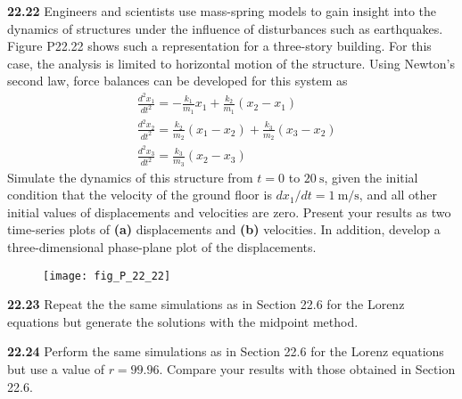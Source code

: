 \documentclass[../main.tex]{subfiles}
\begin{document}
\begin{multicols}{2}
    \noindent\textbf{22.22} Engineers and scientists use mass-spring models to gain insight into the dynamics of structures under the influence of disturbances such as earthquakes. Figure P22.22 shows such a representation for a three-story building. For this case, the analysis is limited to horizontal motion of the structure. Using Newton's second law, force balances can be developed for this system as
    $$
    \begin{aligned}
    &\frac{d^{2} x_{1}}{d t^{2}}=-\frac{k_{1}}{m_{1}} x_{1}+\frac{k_{2}}{m_{1}}\left(x_{2}-x_{1}\right) \\
    &\frac{d^{2} x_{2}}{d t^{2}}=\frac{k_{2}}{m_{2}}\left(x_{1}-x_{2}\right)+\frac{k_{3}}{m_{2}}\left(x_{3}-x_{2}\right) \\
    &\frac{d^{2} x_{3}}{d t^{2}}=\frac{k_{3}}{m_{3}}\left(x_{2}-x_{3}\right)
    \end{aligned}
    $$
    Simulate the dynamics of this structure from $t=0$ to $20 \mathrm{~s}$, given the initial condition that the velocity of the ground floor is $d x_{1} / d t=1 \mathrm{~m} / \mathrm{s}$, and all other initial values of displacements and velocities are zero. Present your results as two time-series plots of \textbf{(a)} displacements and \textbf{(b)} velocities. In addition, develop a     three-dimensional phase-plane plot of the displacements.
    
    \begin{figure}[H]
        \centering
        \texttt{[image: fig\_P\_22\_22]}
        \caption{\textsf{}}
        \label{fig:fig_P_22_22}
    \end{figure}\vspace{2mm}

    \noindent\textbf{22.23} Repeat the the same simulations as in Section 22.6
    for the Lorenz equations but generate the solutions with the
    midpoint method.\vspace{2mm}

    \noindent\textbf{22.24} Perform the same simulations as in Section 22.6 for
    the Lorenz equations but use a value of $r = 99.96$. Compare
    your results with those obtained in Section 22.6.\vspace{2mm}
    \end{multicols}
\end{document}
